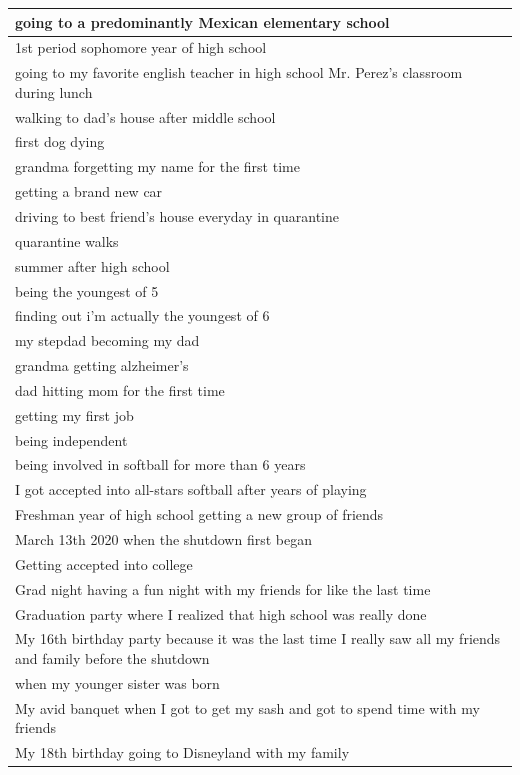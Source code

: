 \documentclass[
  .7em,
  letterpaper,
  DIV=11,
  numbers=noendperiod]{scrartcl}
\begin{document}
\begin{table}
\begin{tabular}{l}
\hline
going to a predominantly Mexican elementary school\\
\hline
1st period sophomore year of high school\\
\hline
going to my favorite english teacher in high school Mr. Perez's classroom during lunch\\
\hline
walking to dad's house after middle school\\
\hline
first dog dying\\
\hline
grandma forgetting my name for the first time\\
\hline
getting a brand new car\\
\hline
driving to best friend's house everyday in quarantine\\
\hline
quarantine walks\\
\hline
summer after high school\\
\hline
being the youngest of 5\\
\hline
finding out i'm actually the youngest of 6\\
\hline
my stepdad becoming my dad\\
\hline
grandma getting alzheimer's\\
\hline
dad hitting mom for the first time\\
\hline
getting my first job\\
\hline
being independent\\
\hline
being involved in softball for more than 6 years\\
\hline
I got accepted into all-stars softball after years of playing\\
\hline
Freshman year of high school getting a new group of friends\\
\hline
March 13th 2020 when the shutdown first began\\
\hline
Getting accepted into college\\
\hline
Grad night having a fun night with my friends for like the last time\\
\hline
Graduation party where I realized that high school was really done\\
\hline
My 16th birthday party because it was the last time I really saw all my friends and family before the shutdown\\
\hline
when my younger sister was born\\
\hline
My avid banquet when I got to get my sash and got to spend time with my friends\\
\hline
My 18th birthday going to Disneyland with my family\\

\end{tabular}
\end{table}
\end{document}
